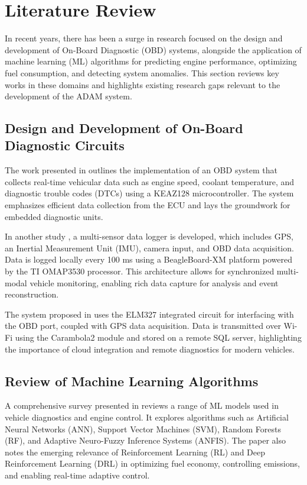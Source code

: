 \section{Literature Review}

In recent years, there has been a surge in research focused on the design and development of On-Board Diagnostic (OBD) systems, alongside the application of machine learning (ML) algorithms for predicting engine performance, optimizing fuel consumption, and detecting system anomalies. This section reviews key works in these domains and highlights existing research gaps relevant to the development of the ADAM system.

\subsection{Design and Development of On-Board Diagnostic Circuits}

The work presented in \cite{b1} outlines the implementation of an OBD system that collects real-time vehicular data such as engine speed, coolant temperature, and diagnostic trouble codes (DTCs) using a KEAZ128 microcontroller. The system emphasizes efficient data collection from the ECU and lays the groundwork for embedded diagnostic units.

In another study \cite{b2}, a multi-sensor data logger is developed, which includes GPS, an Inertial Measurement Unit (IMU), camera input, and OBD data acquisition. Data is logged locally every 100 ms using a BeagleBoard-XM platform powered by the TI OMAP3530 processor. This architecture allows for synchronized multi-modal vehicle monitoring, enabling rich data capture for analysis and event reconstruction.

The system proposed in \cite{b3} uses the ELM327 integrated circuit for interfacing with the OBD port, coupled with GPS data acquisition. Data is transmitted over Wi-Fi using the Carambola2 module and stored on a remote SQL server, highlighting the importance of cloud integration and remote diagnostics for modern vehicles.

\subsection{Review of Machine Learning Algorithms}

A comprehensive survey presented in \cite{b4} reviews a range of ML models used in vehicle diagnostics and engine control. It explores algorithms such as Artificial Neural Networks (ANN), Support Vector Machines (SVM), Random Forests (RF), and Adaptive Neuro-Fuzzy Inference Systems (ANFIS). The paper also notes the emerging relevance of Reinforcement Learning (RL) and Deep Reinforcement Learning (DRL) in optimizing fuel economy, controlling emissions, and enabling real-time adaptive control.

